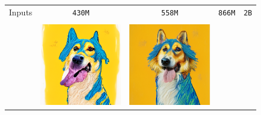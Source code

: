 \begin{figure}[!ht]
\begin{tabular}[t]{c c c c c}
    Inputs & \texttt{430M} &  \texttt{558M} &  \texttt{866M} &  \texttt{2B} \\
    \\
    &
    \includegraphics[width=\xwidth]{cp2/figures/dreambooth/dog/c96_checkpoint_99.png} &
    \includegraphics[width=\xwidth]{cp2/figures/dreambooth/dog/c128_checkpoint_99.png} &

\end{tabular}
\end{figure}
